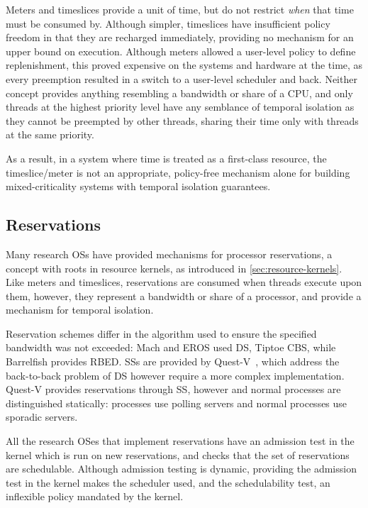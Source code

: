 Meters and timeslices provide a unit of time, but do not restrict \emph{when} that time must be consumed
by. Although simpler, timeslices have insufficient policy freedom in that they are recharged immediately,
providing no mechanism for an upper bound on execution. Although meters allowed a user-level policy 
to define replenishment, this proved expensive on the systems and hardware at the time, as every
preemption resulted in a switch to a user-level scheduler and back. Neither concept provides
anything resembling a bandwidth or share of a CPU, and only threads at the highest priority level
have any semblance of temporal isolation as they cannot be preempted by other threads, sharing their
time only with threads at the same priority.

As a result, in a system where time is treated as a first-class resource,
the timeslice/meter is not an appropriate, policy-free mechanism alone for building mixed-criticality
systems with temporal isolation guarantees.

\subsection{Reservations}

Many research \glspl{OS} have provided mechanisms for processor reservations, a concept with roots
in resource kernels, as introduced in \cref{sec:resource-kernels}. Like meters and timeslices,
reservations are consumed when threads execute upon them, however, they represent a bandwidth or
share of a processor, and provide a mechanism for temporal isolation.

Reservation schemes differ in the algorithm used to ensure the specified bandwidth was not
exceeded: Mach and EROS used \gls{DS}, Tiptoe \gls{CBS}, while Barrelfish provides \gls{RBED}. 
\Glspl{SS} are provided by Quest-V~\citep{Li_WCM_14}, which address the back-to-back
problem of \gls{DS} however require a more complex implementation.
Quest-V provides reservations through \gls{SS}, however \IO and normal processes
are distinguished statically: \IO processes use polling servers and normal processes use sporadic
servers. 

All the research OSes that implement reservations have an admission
test in the kernel which is run on new reservations, and checks that the set of reservations are
schedulable. Although admission testing is dynamic, providing the admission test in the kernel makes the scheduler used, and the
schedulability test, an inflexible policy mandated by the kernel. 

